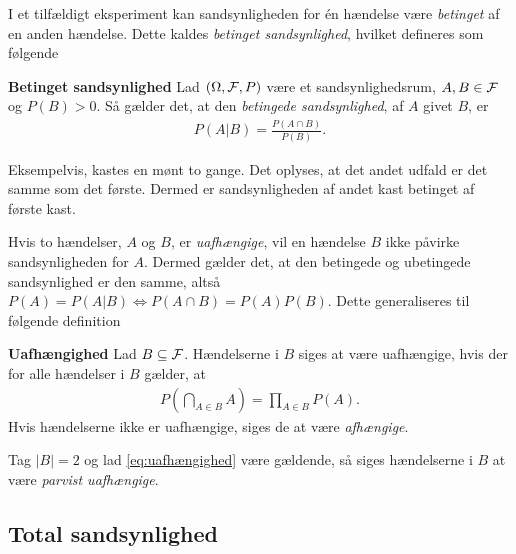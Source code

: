 I et tilfældigt eksperiment kan sandsynligheden for én hændelse være \textit{betinget} af en anden hændelse. Dette kaldes \textit{betinget sandsynlighed}, hvilket defineres som følgende

\begin{minipage}\textwidth
\begin{defn}\textbf{Betinget sandsynlighed} \label{def:betinget_sandsynlighed}%
\newline
Lad $(\Omega, \mathcal{F}, P)$ være et sandsynlighedsrum, $A,B\in \mathcal{F}$ og $P(B)>0$. Så gælder det, at den \textit{betingede sandsynlighed}, af $A$ givet $B$, er
\begin{align*}
      \displaystyle P(A|B)=\frac{P(A\cap B)}{P(B)}.
\end{align*}
\end{defn}
\end{minipage}

Eksempelvis, kastes en mønt to gange. Det oplyses, at det andet udfald er det samme som det første. Dermed er sandsynligheden af andet kast betinget af første kast.

Hvis to hændelser, $A$ og $B$, er \textit{uafhængige}, vil en hændelse $B$ ikke påvirke sandsynligheden for $A$. Dermed gælder det, at den betingede og ubetingede sandsynlighed er den samme, altså $P(A)=P(A|B)\Leftrightarrow P(A\cap B)=P(A)P(B)$. Dette generaliseres til følgende definition

\begin{minipage}\textwidth
\begin{defn}\textbf{Uafhængighed}\label{def:uafhængighed} %
\newline
Lad $B\subseteq \mathcal{F}$. Hændelserne i $B$ siges at være uafhængige, hvis der for alle hændelser i $B$ gælder, at
\begin{align}\label{eq:uafhængighed}
    P\left(\bigcap_{A\in B} A\right)=\prod_{A\in B} P(A).
\end{align}
Hvis hændelserne ikke er uafhængige, siges de at være \textit{afhængige}.
\end{defn}
\end{minipage}

Tag $|B|=2$ og lad \eqref{eq:uafhængighed} være gældende, så siges hændelserne i $B$ at være \textit{parvist uafhængige}.

\subsection{Total sandsynlighed}


